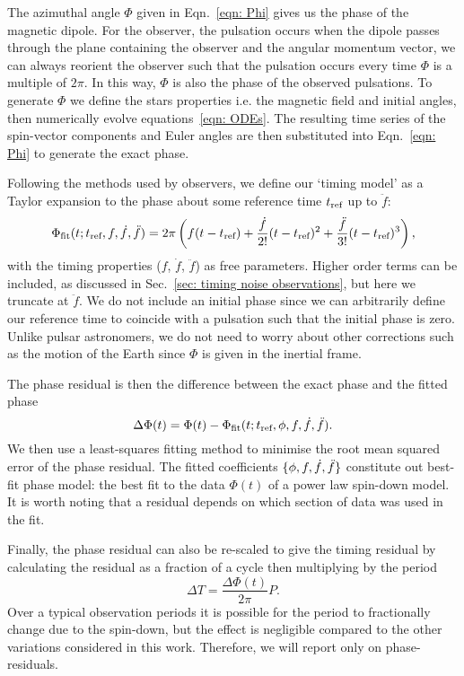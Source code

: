 \documentclass[../full_thesis/full_thesis.tex]{subfiles}
\begin{document}
The azimuthal angle $\Phi$ given in Eqn.~\eqref{eqn: Phi} gives us the phase of
the magnetic dipole. For the observer, the pulsation occurs when the dipole
passes through the plane containing the observer and the angular momentum
vector,  we can always reorient the observer such that the pulsation occurs
every time $\Phi$ is a multiple of $2\pi$. In this way, $\Phi$ is also the
phase of the observed pulsations. To generate $\Phi$ we define the stars
properties i.e. the magnetic field and initial angles, then numerically
evolve equations~\eqref{eqn: ODEs}. The resulting time series of the spin-vector
components and Euler angles are then substituted into Eqn.~\eqref{eqn: Phi} to
generate the exact phase.

Following the methods used by observers, we define our `timing model' as
a Taylor expansion to the phase about some reference time $t_{\textrm{ref}}$ up to $\ddot{f}$:
\begin{equation}
    \Phi_{\mathrm{fit}}(t; t_{\textrm{ref}}, f, \dot{f}, \ddot{f}) =
    2\pi \left(f(t - t_{\textrm{ref}}) +
                          \frac{\dot{f}}{2!}(t-t_{\textrm{ref}})^{2} +
                          \frac{\ddot{f}}{3!}(t-t_{\textrm{ref}})^{3}
                          \right),
\label{eqn: TR taylor expansion}
\end{equation}
with the timing properties ($f$, $\dot{f}$, $\ddot{f}$) as free parameters.
Higher order terms can be included, as discussed in Sec.~\ref{sec: timing noise
observations}, but here we truncate at $\ddot{f}$. We do not include an initial
phase since we can arbitrarily define our reference time to coincide with a
pulsation such that the initial phase is zero.  Unlike pulsar astronomers, we
do not need to worry about other corrections such as the motion of the Earth
since $\Phi$ is given in the inertial frame.

The phase residual is then the difference between the exact phase
and the fitted phase
\begin{equation}
  \Delta\Phi(t) = \Phi(t) - \Phi_{\mathrm{fit}}(t; t_{\textrm{ref}}, \phi, f, \dot{f}, \ddot{f}).
\end{equation}
We then use a least-squares fitting method to minimise the root mean squared
error of the phase residual. The fitted coefficients $\{\phi, f, \dot{f},
\ddot{f}\}$ constitute out best-fit phase model: the best fit to the data
$\Phi(t)$ of a power law spin-down model.  It is worth noting that a residual
depends on which section of data was used in the fit.

Finally, the phase residual can also be re-scaled to give the timing residual by
calculating the residual as a fraction of a cycle then multiplying by the
period
\begin{equation}
    \Delta T = \frac{\Delta\Phi(t)}{2\pi} P.
    \label{eqn: phase to timing}
\end{equation}
Over a typical observation periods it is possible for the period to
fractionally change due to the spin-down, but the effect is negligible compared
to the other variations considered in this work. Therefore, we will report only
on phase-residuals.
\end{document}
